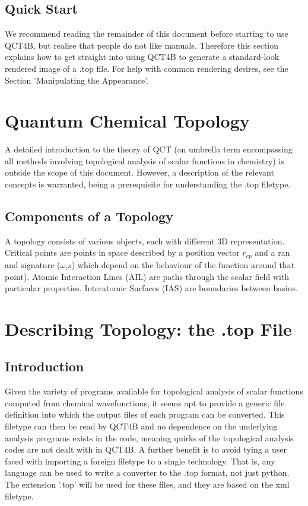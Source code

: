 \documentclass{report}
\begin{document}
\section{Quick Start}

We recommend reading the remainder of this document before starting to use QCT4B, but realise that people do not like manuals.
Therefore this section explains how to get straight into using QCT4B to generate a standard-look rendered image of a .top file.
For help with common rendering desires, see the Section 'Manipulating the Appearance'.

\chapter{Quantum Chemical Topology}

A detailed introduction to the theory of QCT (an umbrella term encompassing all methods involving topological analysis of scalar functions in chemistry) is outside the scope of this document.
However, a description of the relevant concepts is warranted, being a prerequisite for understanding the .top filetype.

\section{Components of a Topology}

A topology consists of various objects, each with different 3D representation. 
Critical points are points in space described by a position vector $r_{cp}$ and a ran and signature ($\omega$,$s$) which depend on the behaviour of the function around that point).
Atomic Interaction Lines (AIL) are paths through the scalar field with particular properties.
Interatomic Surfaces (IAS) are boundaries between basins.

\chapter{Describing Topology: the .top File}

\section{Introduction}

Given the variety of programs available for topological analysis of scalar functions computed from chemical wavefunctions,
it seems apt to provide a generic file definition into which the output files of each program can be converted.
This filetype can then be read by QCT4B and no dependence on the underlying analysis programs exists in the code, meaning quirks of the topological analysis codes are not dealt with in QCT4B.
A further benefit is to avoid tying a user faced with importing a foreign filetype to a single technology.
That is, any language can be used to write a converter to the .top format, not just python.
The extension '.top' will be used for these files, and they are based on the xml filetype.
\end{document}
